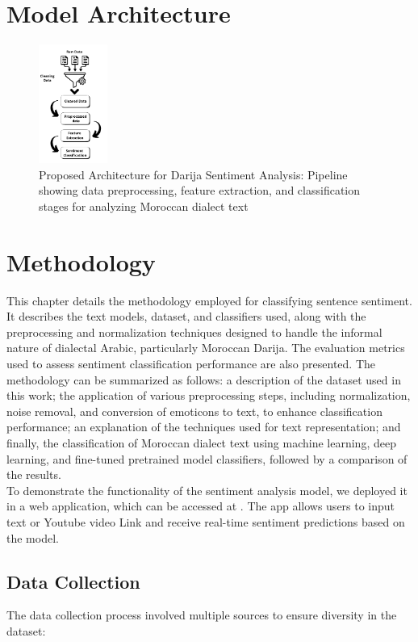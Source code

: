 \documentclass[a4paper,40pt,twocolumn]{article}
\begin{document}
\section{Model Architecture}
\begin{figure}[h!]
    \hspace{0cm}
    \centering
    \includegraphics[width=0.2\textwidth]{archi_ml.png}
    \caption{Proposed Architecture for Darija Sentiment Analysis: Pipeline showing data preprocessing, feature extraction, and classification stages for analyzing Moroccan dialect text}
    \label{fig:architecture}
\end{figure}

\section{Methodology}
This chapter details the methodology employed for classifying sentence sentiment. It describes the text models, dataset, and classifiers used, along with the preprocessing and normalization techniques designed to handle the informal nature of dialectal Arabic, particularly Moroccan Darija. The evaluation metrics used to assess sentiment classification performance are also presented. The methodology can be summarized as follows: a description of the dataset used in this work; the application of various preprocessing steps, including normalization, noise removal, and conversion of emoticons to text, to enhance classification performance; an explanation of the techniques used for text representation; and finally, the classification of Moroccan dialect text using machine learning, deep learning, and fine-tuned pretrained model classifiers, followed by a comparison of the results.\\
To demonstrate the functionality of the sentiment analysis model, we deployed it in a web application, which can be accessed at \cite{weblink}. The app allows users to input text or Youtube video Link and receive real-time sentiment predictions based on the model.

\subsection{Data Collection}
The data collection process involved multiple sources to ensure diversity in the dataset:\\
\end{document}
